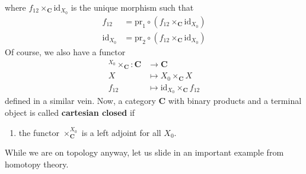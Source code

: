 where $f_{12} \times_{\mathbf{C}} \mathrm{id}_{X_{0}}$ is the unique morphism such that
\begin{align*}
  f_{12}
  &=
  \mathrm{pr}_{1}
  \circ
  \left(
    f_{12}
    \times_{\mathbf{C}}
    \mathrm{id}_{X_{0}}
  \right)
  \\
  \mathrm{id}_{X_{0}}
  &=
  \mathrm{pr}_{2}
  \circ
  \left(
    f_{12}
    \times_{\mathbf{C}}
    \mathrm{id}_{X_{0}}
  \right)
\end{align*}
Of course, we also have a functor
\begin{align*}
  {}^{X_{0}}\times_{\mathbf{C}}
  \colon
  \mathbf{C}
  &\rightarrow
  \mathbf{C}
  \\
  X
  &\mapsto
  X_{0}
  \times_{\mathbf{C}}
  X
  \\
  f_{12}
  &\mapsto
  \mathrm{id}_{X_{0}}
  \times_{\mathbf{C}}
  f_{12}
\end{align*}
defined in a similar vein.
Now, a category $\mathbf{C}$ with binary products and a terminal object is called \textbf{cartesian closed} if
\begin{enumerate}
\item[(CC)]
the functor $\times_{\mathbf{C}}^{X_{0}}$ is a left adjoint for all $X_{0}$.
\end{enumerate}
While we are on topology anyway, let us slide in an important example from homotopy theory.
\\
